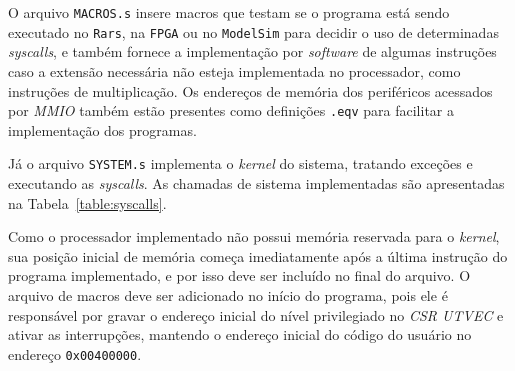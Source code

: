     { O arquivo \texttt{MACROS.s} insere macros que testam se o programa
        está sendo executado no \texttt{Rars}, na \texttt{FPGA} ou no
        \texttt{ModelSim} para decidir o uso de determinadas \textit{syscalls},
        e também fornece a implementação por \textit{software} de algumas
        instruções caso a extensão necessária não esteja implementada no processador,
        como instruções de multiplicação. Os endereços de memória dos periféricos
        acessados por \textit{MMIO} também estão presentes como definições
        \texttt{.eqv} para facilitar a implementação dos programas.
    }

    { Já o arquivo \texttt{SYSTEM.s} implementa o \textit{kernel} do sistema,
        tratando exceções e executando as \textit{syscalls}. As chamadas de
        sistema implementadas são apresentadas na Tabela~\ref{table:syscalls}.
    }

    { Como o processador implementado não possui memória reservada para o
        \textit{kernel}, sua posição inicial de memória começa imediatamente
        após a última instrução do programa implementado, e por isso deve ser
        incluído no final do arquivo. O arquivo de macros deve ser adicionado
        no início do programa, pois ele é responsável por gravar o endereço inicial
        do nível privilegiado no \textit{CSR UTVEC} e ativar as interrupções,
        mantendo o endereço inicial do código do usuário no endereço \texttt{0x00400000}.
    }

